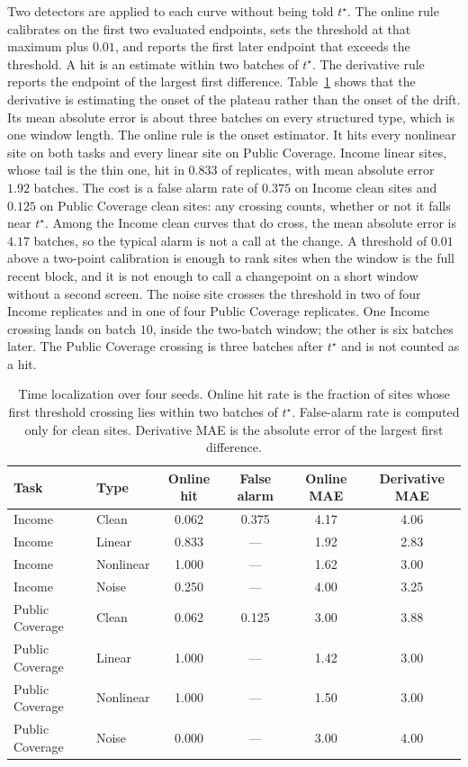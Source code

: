 Two detectors are applied to each curve without being told $t^\star$.
The online rule calibrates on the first two evaluated endpoints, sets the
threshold at that maximum plus $0.01$, and reports the first later endpoint
that exceeds the threshold.
A hit is an estimate within two batches of $t^\star$.
The derivative rule reports the endpoint of the largest first difference.
Table~\ref{tab:time} shows that the derivative is estimating the onset of
the plateau rather than the onset of the drift.
Its mean absolute error is about three batches on every structured type,
which is one window length.
The online rule is the onset estimator.
It hits every nonlinear site on both tasks and every linear site on Public
Coverage.
Income linear sites, whose tail is the thin one, hit in $0.833$ of
replicates, with mean absolute error $1.92$ batches.
The cost is a false alarm rate of $0.375$ on Income clean sites and
$0.125$ on Public Coverage clean sites: any crossing counts, whether or
not it falls near $t^\star$.
Among the Income clean curves that do cross, the mean absolute error is
$4.17$ batches, so the typical alarm is not a call at the change.
A threshold of $0.01$ above a two-point calibration is enough to rank
sites when the window is the full recent block, and it is not enough to
call a changepoint on a short window without a second screen.
The noise site crosses the threshold in two of four Income replicates and
in one of four Public Coverage replicates.
One Income crossing lands on batch $10$, inside the two-batch window; the
other is six batches later.
The Public Coverage crossing is three batches after $t^\star$ and is not
counted as a hit.

\begin{table}[t]
\centering
\caption{Time localization over four seeds.
Online hit rate is the fraction of sites whose first threshold crossing
lies within two batches of $t^\star$.
False-alarm rate is computed only for clean sites.
Derivative MAE is the absolute error of the largest first difference.}
\label{tab:time}
\begin{tabular}{llcccc}
\toprule
Task & Type & Online hit & False alarm & Online MAE & Derivative MAE \\
\midrule
Income & Clean & 0.062 & 0.375 & 4.17 & 4.06 \\
Income & Linear & 0.833 & --- & 1.92 & 2.83 \\
Income & Nonlinear & 1.000 & --- & 1.62 & 3.00 \\
Income & Noise & 0.250 & --- & 4.00 & 3.25 \\
Public Coverage & Clean & 0.062 & 0.125 & 3.00 & 3.88 \\
Public Coverage & Linear & 1.000 & --- & 1.42 & 3.00 \\
Public Coverage & Nonlinear & 1.000 & --- & 1.50 & 3.00 \\
Public Coverage & Noise & 0.000 & --- & 3.00 & 4.00 \\
\bottomrule
\end{tabular}
\end{table}

